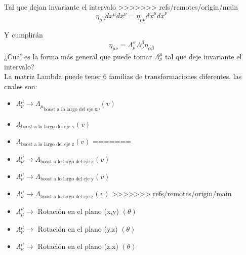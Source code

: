 \documentclass[../main.tex]{subfiles}
\begin{document}


Tal que dejan invariante el intervalo
>>>>>>> refs/remotes/origin/main
\begin{equation*}
  \eta_{\mu \nu} dx^\mu dx^\nu = \eta_{\mu \nu}d\tilde{x}^\mu d\tilde{x}^\nu
\end{equation*}

Y cumplirán
\begin{equation*}
  \eta_{\mu \nu} = \Lambda_\mu^\alpha \Lambda^\beta_\nu \eta_{\alpha \beta}
\end{equation*}
¿Cuál es la forma más general que puede tomar $\Lambda_\nu^\mu$ tal que deje invariante el intervalo? \\
La matriz Lambda puede tener 6 familias de transformaciones diferentes, las cuales son:
\begin{itemize}
<<<<<<< HEAD
  \item $\Lambda_\nu^\mu \rightarrow {\Lambda_\mu}_{\text{boost a lo largo del eje x}\nu}(v)$ 
  \item $\Lambda_{\text{boost a lo largo del eje y}}(v)$
  \item $\Lambda_{\text{boost a lo largo del eje z}}(v)$ 
=======
  \item $\Lambda_\nu^\mu\rightarrow \Lambda_{\text{boost a lo largo del eje x}}(v)$ 
  \item $\Lambda_\nu^\mu\rightarrow \Lambda_{\text{boost a lo largo del eje y}}(v)$
  \item $\Lambda_\nu^\mu\rightarrow \Lambda_{\text{boost a lo largo del eje z}}(v)$ 
>>>>>>> refs/remotes/origin/main
  \item $\Lambda_\mu^\nu \rightarrow$ Rotación en el plano (x,y) $(\theta)$
  \item $\Lambda_\nu^\mu\rightarrow$ Rotación en el plano (y,z) $(\theta)$
  \item $\Lambda_\nu^\mu\rightarrow$ Rotación en el plano (z,x) $(\theta)$
\end{itemize}
\end{document}
